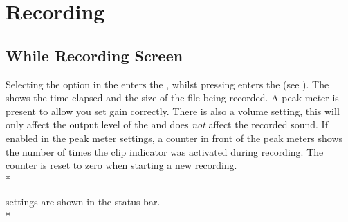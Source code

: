\section{\label{ref:Recording}Recording}
\subsection{\label{ref:while_recording_screen}While Recording Screen}

Selecting the  option in the  enters
the , whilst pressing \ActionStdContext{} enters the
 (see ). 
The 
shows the time elapsed and the size of the file being recorded. A peak meter
is present to allow you set gain correctly. There is also a volume setting,
this will only affect the output level of the \dap{} and does \emph{not}
affect the recorded sound. If enabled in the peak meter settings, a counter in
front of the peak meters shows the number of times the clip indicator was
activated during recording. The counter is reset to zero when starting a new
recording.\\*


 settings are shown in the
status bar.\\*

